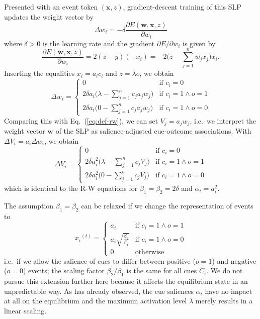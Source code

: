 \documentclass[a4paper,11pt]{article} %
\newcommand{\psup}[1]{\ensuremath{^{(#1)}}}
\newcommand{\psupt}{\psup{t}}
\begin{document}
Presented with an event token $(\mathbf{x}, z)$, gradient-descent training of this SLP updates the weight vector by 
\begin{equation}
  \label{eq:gd-rule}
  \Delta w_i = -\delta \frac{\partial E(\mathbf{w}, \mathbf{x}, z)}{\partial w_i}
\end{equation}
where $\delta > 0$ is the learning rate and the gradient $\partial E / \partial w_i$ is given by
\begin{equation}
  \label{eq:gd-gradient}
  \frac{\partial E(\mathbf{w}, \mathbf{x}, z)}{\partial w_i} = 2 (z - y) (-x_i)
  = -2 \biggl( z - \sum_{j=1}^n w_j x_j \biggr) x_i .
\end{equation}
Inserting the equalities $x_i = a_i c_i$ and $z = \lambda o$, we obtain
\begin{equation}
  \label{eq:slp-delta}
    \Delta w_i =
    \begin{cases}
      0 & \text{if } c_i = 0\\
      2 \delta a_i \bigl(\lambda - \sum_{j=1}^n c_j a_j w_j \bigr) & \text{if } c_i = 1 \wedge o = 1 \\
      2 \delta a_i \bigl(0 - \sum_{j=1}^n c_j a_j w_j \bigr) & \text{if } c_i = 1 \wedge o = 0 
    \end{cases}
\end{equation}
Comparing this with Eq.~(\ref{eq:def-rw}), we can set $V_j = a_j w_j$, i.e.\ we interpret the weight vector $\mathbf{w}$ of the SLP as salience-adjusted cue-outcome associations.  With $\Delta V_i = a_i \Delta w_i$, we obtain
\begin{equation}
    \Delta V_i =
    \begin{cases}
      0 & \text{if } c_i = 0\\
      2 \delta a_i^2 \bigl(\lambda - \sum_{j=1}^n c_j V_j \bigr) & \text{if } c_i = 1 \wedge o = 1 \\
      2 \delta a_i^2 \bigl(0 - \sum_{j=1}^n c_j V_j \bigr) & \text{if } c_i = 1 \wedge o = 0
    \end{cases}
\end{equation}
which is identical to the R-W equations for $\beta_1 = \beta_2 = 2\delta$ and $\alpha_i = a_i^2$.

The assumption $\beta_1 = \beta_2$ can be relaxed if we change the representation of events to
\begin{equation}
  \label{eq:def-x-mod}
  x_i\psupt = 
  \begin{cases}
    a_i & \text{if } c_i = 1 \wedge o = 1 \\
    a_i \sqrt{\frac{\beta_2}{\beta_1}} & \text{if } c_i = 1 \wedge o = 0 \\
    0 & \text{otherwise}
  \end{cases}
\end{equation}
i.e.\ if we allow the salience of cues to differ between positive ($o = 1$) and negative ($o = 0$) events; the scaling factor $\beta_2 / \beta_1$ is the same for all cues $C_i$.  We do not pursue this extension further here because it affects the equilibrium state in an unpredictable way.  As \citet{Danks:03} has already observed, the cue saliences $\alpha_i$ have no impact at all on the equilibrium and the maximum activation level $\lambda$ merely results in a linear scaling. 
\end{document}
